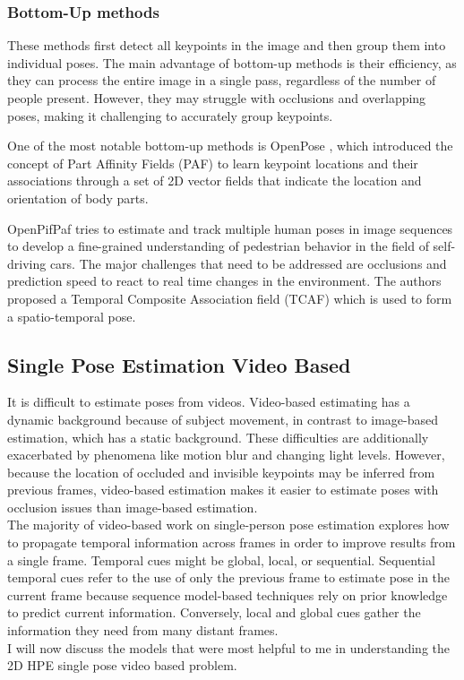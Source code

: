 \subsubsection{Bottom-Up methods}
These methods first detect all keypoints in the image and then group them into individual poses. The main advantage of bottom-up methods is their efficiency, as they can process the entire image in a single pass, regardless 
of the number of people present. However, they may struggle with occlusions and overlapping poses, making it challenging to accurately group keypoints.

One of the most notable bottom-up methods is OpenPose \cite{cao2019openpose}, which introduced the concept of Part Affinity Fields (PAF) to learn keypoint locations and their associations through a set of 2D vector fields that indicate 
the location and orientation of body parts.

OpenPifPaf \cite{kreiss2021openpifpaf} tries to estimate and track multiple human poses in image sequences to develop a fine-grained understanding of pedestrian behavior in the field of self-driving cars. The major challenges that need to be addressed 
are occlusions and prediction speed to react to real time changes in the environment. The authors proposed a Temporal Composite Association field (TCAF) which is used to form a spatio-temporal pose.


\subsection{Single Pose Estimation Video Based}
It is difficult to estimate poses from videos. Video-based estimating has a dynamic background because of subject movement, in contrast to image-based estimation, which has a static background. These difficulties are additionally exacerbated by phenomena like motion 
blur and changing light levels. However, because the location of occluded and invisible keypoints may be inferred from previous frames, video-based estimation makes it easier to estimate poses with occlusion issues than image-based estimation.
\\The majority of video-based work on single-person pose estimation explores how to propagate temporal information across frames in order to improve results from a single frame. Temporal cues might be global, local, or sequential. 
Sequential temporal cues refer to the use of only the previous frame to estimate pose in the current frame because sequence model-based techniques rely on prior knowledge to predict current 
information. Conversely, local and global cues gather the information they need from many distant frames.\\
I will now discuss the models that were most helpful to me in understanding the 2D HPE single pose video based problem.

